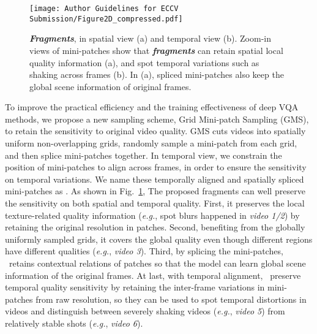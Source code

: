 \documentclass[runningheads]{llncs}
\begin{document}
\begin{figure}[htbp]
    \centering
    \texttt{[image: Author Guidelines for ECCV Submission/Figure2D\_compressed.pdf]}
    \caption{\textbf{\textit{Fragments}}, in spatial view (a) and temporal view (b). Zoom-in views of mini-patches show that \textbf{\textit{fragments}} can retain spatial local quality information (a), and spot temporal variations such as shaking across frames (b). In (a), spliced mini-patches also keep the global scene information of original frames.}
    \label{fig:2}
    \vspace{-20pt}
\end{figure}


















To improve the practical efficiency and the training effectiveness of deep VQA methods, we propose a new sampling scheme, Grid Mini-patch Sampling (GMS), to retain the sensitivity to original video quality. GMS cuts videos into spatially uniform non-overlapping grids, randomly sample a mini-patch from each grid, and then splice mini-patches together. In temporal view, we constrain the position of mini-patches to align across frames, in order to ensure the sensitivity on temporal variations. We name these temporally aligned and spatially spliced mini-patches as \frag. As shown in Fig.~\ref{fig:2}, The proposed fragments can well preserve the sensitivity on both spatial and temporal quality. First, it preserves the local texture-related quality information (\emph{e.g.}, spot blurs happened in \textit{video 1/2}) by retaining the original resolution in patches. Second, benefiting from the globally uniformly sampled grids, it covers the global quality even though different regions have different qualities (\emph{e.g.}, \textit{video 3}). Third, by splicing the mini-patches, \frag~retains contextual relations of patches so that the model can learn global scene information of the original frames. At last, with temporal alignment, \frag~preserve temporal quality sensitivity by retaining the inter-frame variations in mini-patches from raw resolution, so they can be used to spot temporal distortions in videos and distinguish between severely shaking videos (\emph{e.g.}, \textit{video 5}) from relatively stable shots (\emph{e.g.}, \textit{video 6}).
\end{document}
